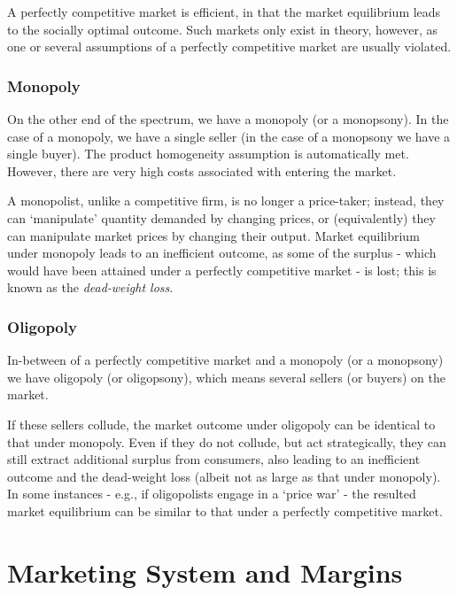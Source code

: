 \documentclass[
]{book}
\begin{document}
A perfectly competitive market is efficient, in that the market equilibrium leads to the socially optimal outcome. Such markets only exist in theory, however, as one or several assumptions of a perfectly competitive market are usually violated.

\hypertarget{monopoly}{%
\subsection{Monopoly}\label{monopoly}}

On the other end of the spectrum, we have a monopoly (or a monopsony). In the case of a monopoly, we have a single seller (in the case of a monopsony we have a single buyer). The product homogeneity assumption is automatically met. However, there are very high costs associated with entering the market.

A monopolist, unlike a competitive firm, is no longer a price-taker; instead, they can `manipulate' quantity demanded by changing prices, or (equivalently) they can manipulate market prices by changing their output. Market equilibrium under monopoly leads to an inefficient outcome, as some of the surplus - which would have been attained under a perfectly competitive market - is lost; this is known as the \emph{dead-weight loss}.

\hypertarget{oligopoly}{%
\subsection{Oligopoly}\label{oligopoly}}

In-between of a perfectly competitive market and a monopoly (or a monopsony) we have oligopoly (or oligopsony), which means several sellers (or buyers) on the market.

If these sellers collude, the market outcome under oligopoly can be identical to that under monopoly. Even if they do not collude, but act strategically, they can still extract additional surplus from consumers, also leading to an inefficient outcome and the dead-weight loss (albeit not as large as that under monopoly). In some instances - e.g., if oligopolists engage in a `price war' - the resulted market equilibrium can be similar to that under a perfectly competitive market.

\hypertarget{marketing-system-and-margins}{%
\chapter{Marketing System and Margins}\label{marketing-system-and-margins}}
\end{document}
